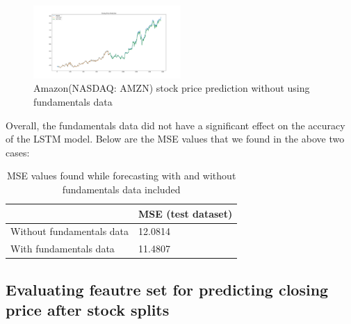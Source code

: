 \documentclass{article}
\begin{document}
\begin{figure}[h]
\centering
\includegraphics[width=0.5\textwidth]{amazon_without_fundamentals}
\caption{Amazon(NASDAQ: AMZN) stock price prediction without using fundamentals data}
\label{fig:amazon_without_funda}
\end{figure}

Overall, the fundamentals data did not have a significant effect on the accuracy of the LSTM model. Below are the MSE values that we found in the above two cases:
\begin{table}[H]
\centering
\label{evaluation_mse_amazon}
\begin{tabular}{|l|l|}
\hline
                          & MSE (test dataset)          \\ \hline
Without fundamentals data & 12.0814 \\ \hline
With fundamentals data    & 11.4807 \\ \hline
\end{tabular}
\caption{MSE values found while forecasting with and without fundamentals data included}
\end{table}
 
\subsection{Evaluating feautre set for predicting closing price after stock splits}
\label{sssec:predicting_stock_splits}
\end{document}
